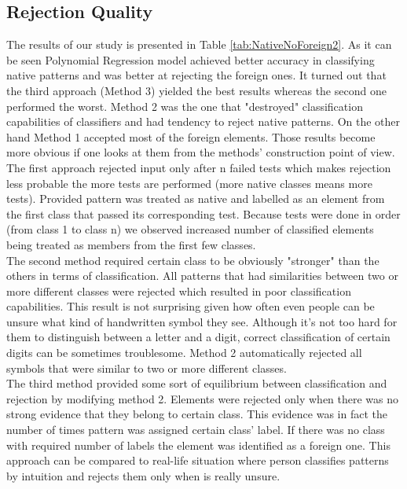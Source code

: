 \documentclass{llncs}
\begin{document}


\subsection{Rejection Quality}
	\label{sec:Experiments}

The results of our study is presented in Table \ref{tab:NativeNoForeign2}. As it can be seen Polynomial Regression model achieved better accuracy in classifying native patterns and was better at rejecting the foreign ones. It turned out that the third approach (Method 3) yielded the best results whereas the second one performed the worst. Method 2 was the one that "destroyed" classification capabilities of classifiers and had tendency to reject native patterns. On the other hand Method 1 accepted most of the foreign elements. Those results become more obvious if one looks at them from the methods' construction point of view. \\

The first approach rejected input only after n failed tests which makes rejection less probable the more tests are performed (more native classes means more tests). Provided pattern was treated as native and labelled as an element from the first class that passed its corresponding test. Because tests were done in order (from class 1 to class n) we observed increased number of classified elements being treated as members from the first few classes.\\

The second method required certain class to be obviously "stronger" than the others in terms of classification. All patterns that had similarities between two or more different classes were rejected which resulted in poor classification capabilities. This result is not surprising given how often even people can be unsure what kind of handwritten symbol they see. Although it's not too hard for them to distinguish between a letter and a digit, correct classification of certain digits can be sometimes troublesome. Method 2 automatically rejected all symbols that were similar to two or more different classes. \\

The third method provided some sort of equilibrium between classification and rejection by modifying method 2. Elements were rejected only when there was no strong evidence that they belong to certain class. This evidence was in fact the number of times pattern was assigned certain class' label. If there was no class with required number of labels the element was identified as a foreign one. This approach can be compared to real-life situation where person classifies patterns by intuition and rejects them only when is really unsure. 
\end{document}
